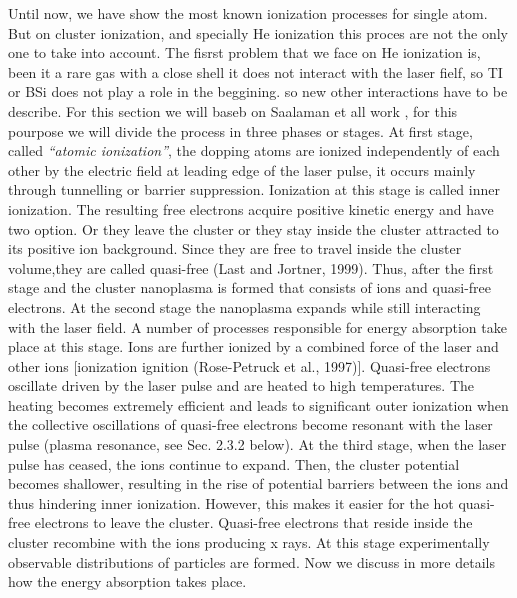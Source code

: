 Until now, we have show the most known ionization processes for single atom. But on cluster ionization, and specially He ionization this proces are not the only one to take into account. The fisrst problem that we face on He ionization is, been it a rare gas with a close shell it does not interact with the laser fielf, so TI or BSi does not play a role in the beggining. so new other interactions have to be describe. For this section we will baseb on Saalaman et all work \cite{saalmann_mechanisms_2006}, for this pourpose we will divide the process in three phases or stages.
At first stage, called \textit{“atomic ionization”}, the dopping atoms are ionized independently of each other by the electric field at leading edge of the laser pulse, it occurs mainly through tunnelling or barrier suppression. Ionization at this stage is called inner ionization. The resulting free electrons acquire positive kinetic energy and have two option. Or they leave the cluster or they stay inside the cluster attracted to its positive ion background. Since they are free to travel inside the cluster volume,they are called quasi-free (Last and Jortner, 1999). Thus, after the first stage and the cluster nanoplasma is formed that consists of ions and quasi-free electrons.
At the second stage the nanoplasma expands while still interacting with the laser field. A number of processes responsible for energy absorption take place at this stage. Ions are further ionized by a combined force of the laser and other ions [ionization ignition (Rose-Petruck et al., 1997)]. Quasi-free electrons oscillate driven by the laser pulse and are heated to high temperatures. The heating becomes extremely efficient and leads to significant outer ionization when the collective oscillations of quasi-free electrons become resonant with the laser pulse (plasma resonance, see Sec. 2.3.2 below). At the third stage, when the laser pulse has ceased, the ions continue to expand. Then, the cluster potential becomes shallower, resulting in the rise of potential barriers between the ions and thus hindering inner ionization. However, this makes it easier for the hot quasi-free electrons to leave the cluster. Quasi-free electrons that reside inside the cluster recombine with the ions producing x rays. At this stage experimentally observable distributions of particles
are formed. Now we discuss in more details how the energy absorption takes place.




 

